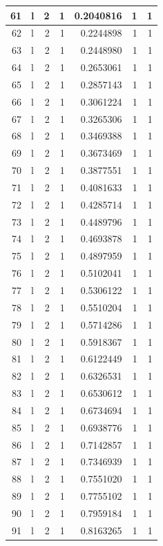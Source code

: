 \documentclass[
  letterpaper,
  DIV=11,
  numbers=noendperiod]{scrreprt}
\begin{document}
\begin{table}
\begin{tabular}[t]{r|l|r|r|r|r|r}
\hline
61 & l & 2 & 1 & 0.2040816 & 1 & 1\\
\hline
62 & l & 2 & 1 & 0.2244898 & 1 & 1\\
\hline
63 & l & 2 & 1 & 0.2448980 & 1 & 1\\
\hline
64 & l & 2 & 1 & 0.2653061 & 1 & 1\\
\hline
65 & l & 2 & 1 & 0.2857143 & 1 & 1\\
\hline
66 & l & 2 & 1 & 0.3061224 & 1 & 1\\
\hline
67 & l & 2 & 1 & 0.3265306 & 1 & 1\\
\hline
68 & l & 2 & 1 & 0.3469388 & 1 & 1\\
\hline
69 & l & 2 & 1 & 0.3673469 & 1 & 1\\
\hline
70 & l & 2 & 1 & 0.3877551 & 1 & 1\\
\hline
71 & l & 2 & 1 & 0.4081633 & 1 & 1\\
\hline
72 & l & 2 & 1 & 0.4285714 & 1 & 1\\
\hline
73 & l & 2 & 1 & 0.4489796 & 1 & 1\\
\hline
74 & l & 2 & 1 & 0.4693878 & 1 & 1\\
\hline
75 & l & 2 & 1 & 0.4897959 & 1 & 1\\
\hline
76 & l & 2 & 1 & 0.5102041 & 1 & 1\\
\hline
77 & l & 2 & 1 & 0.5306122 & 1 & 1\\
\hline
78 & l & 2 & 1 & 0.5510204 & 1 & 1\\
\hline
79 & l & 2 & 1 & 0.5714286 & 1 & 1\\
\hline
80 & l & 2 & 1 & 0.5918367 & 1 & 1\\
\hline
81 & l & 2 & 1 & 0.6122449 & 1 & 1\\
\hline
82 & l & 2 & 1 & 0.6326531 & 1 & 1\\
\hline
83 & l & 2 & 1 & 0.6530612 & 1 & 1\\
\hline
84 & l & 2 & 1 & 0.6734694 & 1 & 1\\
\hline
85 & l & 2 & 1 & 0.6938776 & 1 & 1\\
\hline
86 & l & 2 & 1 & 0.7142857 & 1 & 1\\
\hline
87 & l & 2 & 1 & 0.7346939 & 1 & 1\\
\hline
88 & l & 2 & 1 & 0.7551020 & 1 & 1\\
\hline
89 & l & 2 & 1 & 0.7755102 & 1 & 1\\
\hline
90 & l & 2 & 1 & 0.7959184 & 1 & 1\\
\hline
91 & l & 2 & 1 & 0.8163265 & 1 & 1\\

\end{tabular}
\end{table}
\end{document}
